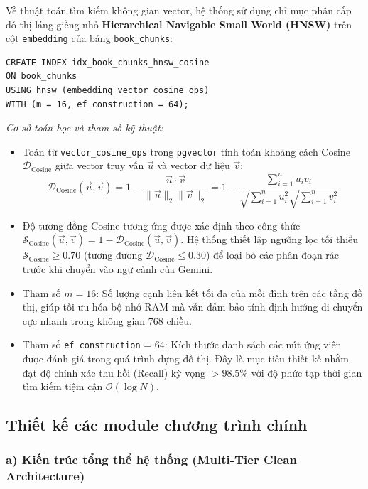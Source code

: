 \documentclass[11pt, a4paper]{report}
\begin{document}
Về thuật toán tìm kiếm không gian vector, hệ thống sử dụng chỉ mục phân cấp đồ thị láng giềng nhỏ \textbf{Hierarchical Navigable Small World (HNSW)} trên cột \texttt{embedding} của bảng \texttt{book\_chunks}:

\begin{verbatim}
CREATE INDEX idx_book_chunks_hnsw_cosine 
ON book_chunks 
USING hnsw (embedding vector_cosine_ops)
WITH (m = 16, ef_construction = 64);
\end{verbatim}

\noindent\textit{Cơ sở toán học và tham số kỹ thuật:}
\begin{itemize}
    \item Toán tử \texttt{vector\_cosine\_ops} trong \texttt{pgvector} tính toán khoảng cách Cosine $\mathcal{D}_{\text{Cosine}}$ giữa vector truy vấn $\vec{u}$ và vector dữ liệu $\vec{v}$:
    \begin{equation}
        \mathcal{D}_{\text{Cosine}}(\vec{u}, \vec{v}) = 1 - \frac{\vec{u} \cdot \vec{v}}{\|\vec{u}\|_2 \|\vec{v}\|_2} = 1 - \frac{\sum_{i=1}^{n} u_i v_i}{\sqrt{\sum_{i=1}^{n} u_i^2} \sqrt{\sum_{i=1}^{n} v_i^2}}
    \end{equation}
    \item Độ tương đồng Cosine tương ứng được xác định theo công thức $\mathcal{S}_{\text{Cosine}}(\vec{u}, \vec{v}) = 1 - \mathcal{D}_{\text{Cosine}}(\vec{u}, \vec{v})$. Hệ thống thiết lập ngưỡng lọc tối thiểu $\mathcal{S}_{\text{Cosine}} \ge 0.70$ (tương đương $\mathcal{D}_{\text{Cosine}} \le 0.30$) để loại bỏ các phân đoạn rác trước khi chuyển vào ngữ cảnh của Gemini.
    \item Tham số $m = 16$: Số lượng cạnh liên kết tối đa của mỗi đỉnh trên các tầng đồ thị, giúp tối ưu hóa bộ nhớ RAM mà vẫn đảm bảo tính định hướng di chuyển cực nhanh trong không gian 768 chiều.
    \item Tham số \texttt{ef\_construction} = 64: Kích thước danh sách các nút ứng viên được đánh giá trong quá trình dựng đồ thị. Đây là mục tiêu thiết kế nhằm đạt độ chính xác thu hồi (Recall) kỳ vọng $>98.5\%$ với độ phức tạp thời gian tìm kiếm tiệm cận $\mathcal{O}(\log N)$.
\end{itemize}

\subsection{Thiết kế các module chương trình chính}

\subsubsection{a) Kiến trúc tổng thể hệ thống (Multi-Tier Clean Architecture)}
\end{document}
